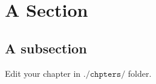 

\section{A Section}

\subsection{A subsection}

\color{red}
Edit your chapter in $\texttt{./chpters/}$ folder.
\color{black}
\citep{1929PNAS...15..168H}

\lipsum